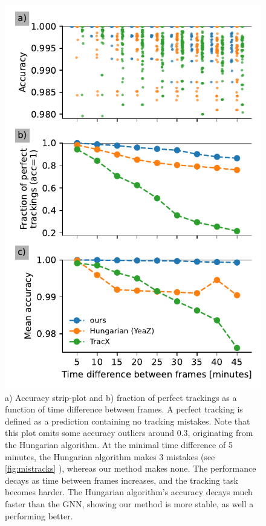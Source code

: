 \documentclass[10pt,conference,compsocconf,a4paper]{IEEEtran}
\newcommand*{\shortautoref}[1]{%
	\begingroup
	\def\equationautorefname{\textsc{Eq.}}%
	\def\tableautorefname{\textsc{Tab.}}%
	\def\figureautorefname{\textsc{Fig.}}%
	\autoref{#1}%
	\endgroup
}
\begin{document}

		\begin{figure}
			\centering
			\includegraphics[width=\linewidth]{figures/timediff_accuracy.pdf}
			\caption{a) Accuracy strip-plot and b) fraction of perfect trackings as a function of time difference between frames. A perfect tracking is defined as a prediction containing no tracking mistakes. Note that this plot omits some accuracy outliers around 0.3, originating from the Hungarian algorithm. At the minimal time difference of 5 minutes, the Hungarian algorithm makes 3 mistakes (see \shortautoref{fig:mistracks}), whereas our method makes none. The performance decays as time between frames increases, and the tracking task becomes harder. The Hungarian algorithm's accuracy decays much faster than the GNN, showing our method is more stable, as well a performing better.}
			\label{fig:timediff_accuracy}
		\end{figure}
\end{document}
